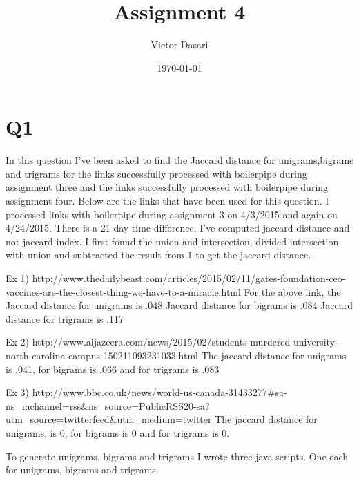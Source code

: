\documentclass[12pt]{article} %
\title{Assignment 4}
\author{Victor Dasari} %
\date{\normalsize\today}
\begin{document}
\newpage



\section{Q1}
In this question I've been asked to find the Jaccard distance for unigrams,bigrams and trigrams for the links successfully processed with boilerpipe during assignment three and the links successfully processed with boilerpipe during assignment four.
Below are the links that have been used for this question.
I processed links with boilerpipe during assignment 3 on 4/3/2015 and again on 4/24/2015. There is a 21 day time difference.
I've computed jaccard distance and not jaccard index. I first found the union and intersection, divided intersection with union and subtracted the result from 1 to get the jaccard distance.

Ex 1) http://www.thedailybeast.com/articles/2015/02/11/gates-foundation-ceo-vaccines-are-the-closest-thing-we-have-to-a-miracle.html
For the above link, the Jaccard distance for unigrams is .048
Jaccard distance for bigrams is .084
Jaccard distance for trigrams is .117

Ex 2) http://www.aljazeera.com/news/2015/02/students-murdered-university-north-carolina-campus-150211093231033.html
The jaccard distance for unigrams is .041, for bigrams is .066 and for trigrams is .083

Ex 3) \url{http://www.bbc.co.uk/news/world-us-canada-31433277#sa-ns_mchannel=rss&ns_source=PublicRSS20-sa?utm_source=twitterfeed&utm_medium=twitter}
The jaccard distance for unigrams, is 0, for bigrams is 0 and for trigrams is 0.

To generate unigrams, bigrams and trigrams I wrote three java scripts. One each for unigrams, bigrams and trigrams. 






\end{document}
